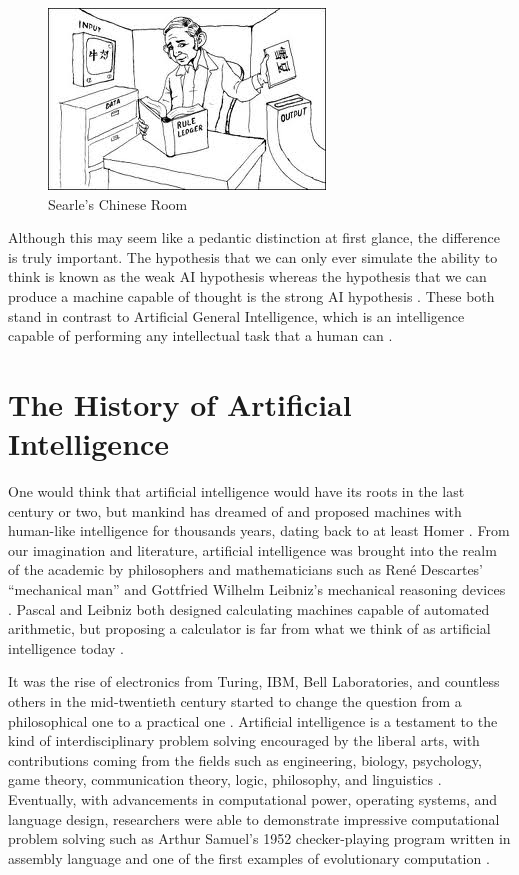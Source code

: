 \documentclass[oneside,12pt,openany]{book}
\begin{document}
	\begin{figure}[!ht]
		\centering
		\includegraphics[width=.4\linewidth]{images/ChineseRoom.jpg}
		\caption[Searle's Chinese Room]{Searle's Chinese Room\footnotemark}
		\label{fig:ChineseRoom}
	\end{figure}
	
	Although this may seem like a pedantic distinction at first glance, the difference is truly important. The hypothesis that we can only ever simulate the ability to think is known as the weak AI hypothesis whereas the hypothesis that we can produce a machine capable of thought is the strong AI hypothesis \cite{Jones}. These both stand in contrast to Artificial General Intelligence, which is an intelligence capable of performing any intellectual task that a human can \cite{Buchanan}.
	
	\section{The History of Artificial Intelligence}
	
	
	One would think that artificial intelligence would have its roots in the last century or two, but mankind has dreamed of and proposed machines with human-like intelligence for thousands years, dating back to at least Homer \cite{Buchanan}. From our imagination and literature, artificial intelligence was brought into the realm of the academic by philosophers and mathematicians such as Ren\'e Descartes' ``mechanical man'' and Gottfried Wilhelm Leibniz's mechanical reasoning devices \cite{Buchanan}. Pascal and Leibniz both designed calculating machines capable of automated arithmetic, but proposing a calculator is far from what we think of as artificial intelligence today  \cite{Buchanan}.
	
	It was the rise of electronics from Turing, IBM, Bell Laboratories, and countless others in the mid-twentieth century started to change the question from a philosophical one to a practical one \cite{Buchanan}. Artificial intelligence is a testament to the kind of interdisciplinary problem solving encouraged by the liberal arts, with contributions coming from the fields such as engineering, biology, psychology, game theory, communication theory, logic, philosophy, and linguistics \cite{Buchanan}. Eventually, with advancements in computational power, operating systems, and language design, researchers were able to demonstrate impressive  computational problem solving such as Arthur Samuel's 1952 checker-playing program written in assembly language and one of the first examples of evolutionary computation \cite{Buchanan}. 
	
\end{document}
